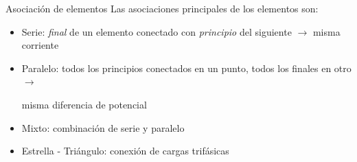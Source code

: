\documentclass[aspectratio=169, xcolor={usenames,svgnames,dvipsnames}]{beamer}
\begin{document}
\begin{frame}{Asociación de elementos}
    Las asociaciones principales de los elementos son:
    \vspace{3mm}
    \begin{itemize}
        \item \alert{Serie}: \textit{final}  de un elemento conectado con \textit{principio} del siguiente $\rightarrow$ \alert{misma corriente}
        \vspace{3mm}
        \item \alert{Paralelo}: todos los principios conectados en un punto, todos los finales en otro $\rightarrow$ 
        
        \hspace{15.5mm} \alert{misma diferencia de potencial}
        \vspace{3mm}
        \item \alert{Mixto}: combinación de serie y paralelo
        \vspace{3mm}
        \item \alert{Estrella - Triángulo}: conexión de cargas trifásicas
    \end{itemize}    
\end{frame}

\end{document}
